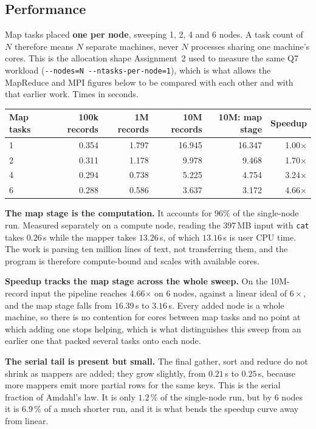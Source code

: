 \documentclass[11pt,a4paper]{article}
\begin{document}
\subsection{Performance}
Map tasks placed \textbf{one per node}, sweeping 1, 2, 4 and 6 nodes. A task count of
$N$ therefore means $N$ separate machines, never $N$ processes sharing one machine's
cores. This is the allocation shape Assignment~2 used to measure the same Q7 workload
(\texttt{-{}-nodes=N -{}-ntasks-per-node=1}), which is what allows the MapReduce and MPI
figures below to be compared with each other and with that earlier work. Times in
seconds.

\begin{center}\small
\begin{tabular}{@{}lrrrrr@{}}
\toprule
\textbf{Map tasks} & \textbf{100k records} & \textbf{1M records} & \textbf{10M records} & \textbf{10M: map stage} & \textbf{Speedup} \\
\midrule
1 & 0.354 & 1.797 & 16.945 & 16.347 & 1.00$\times$ \\
2 & 0.311 & 1.178 & 9.978 & 9.468 & 1.70$\times$ \\
4 & 0.294 & 0.738 & 5.225 & 4.754 & 3.24$\times$ \\
6 & 0.288 & 0.586 & 3.637 & 3.172 & 4.66$\times$ \\
\bottomrule
\end{tabular}
\end{center}

\textbf{The map stage is the computation.} It accounts for 96\% of the
single-node run.
Measured separately on a compute node, reading the 397\,MB input with \texttt{cat} takes
$0.26$\,s while the mapper takes $13.26$\,s, of which $13.16$\,s is user CPU time. The
work is parsing ten million lines of text, not transferring them, and the program is
therefore compute-bound and scales with available cores.

\textbf{Speedup tracks the map stage across the whole sweep.} On the 10M-record input
the pipeline reaches 4.66$\times$ on 6 nodes, against a linear
ideal of $6\times$, and the map stage falls from $16.39$\,s to $3.16$\,s. Every added
node is a whole machine, so there is no contention for cores between map tasks and no
point at which adding one stops helping, which is what distinguishes this sweep from an
earlier one that packed several tasks onto each node.

\textbf{The serial tail is present but small.} The final gather, sort and reduce do not
shrink as mappers are added; they grow slightly, from $0.21$\,s to $0.25$\,s, because
more mappers emit more partial rows for the same keys. This is the serial fraction of
Amdahl's law. It is only $1.2$\,\% of the single-node run, but by 6 nodes it
is $6.9$\,\% of a much shorter run, and it is what bends the speedup curve away from
linear.
\end{document}
